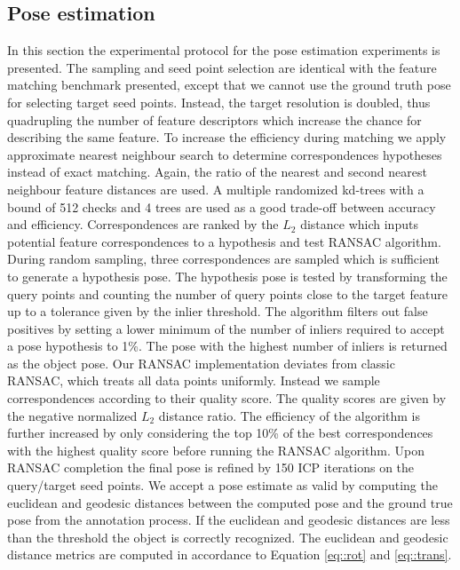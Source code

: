 \documentclass[10pt,twocolumn,letterpaper]{article}
\begin{document}
\subsection{Pose estimation}\label{sec:pose_estimation}
In this section the experimental protocol for the pose estimation experiments is presented. The sampling and seed point selection are identical with the feature matching benchmark presented, except that we cannot use the ground truth pose for selecting target seed points. Instead, the target resolution is doubled, thus quadrupling the number of feature descriptors which increase the chance for describing the same feature. To increase the efficiency during matching we apply approximate nearest neighbour search to determine correspondences hypotheses instead of exact matching. Again, the ratio of the nearest and second nearest neighbour feature distances are used. A multiple randomized kd-trees with a bound of 512 checks and 4 trees are used as a good trade-off between accuracy and efficiency. Correspondences are ranked by the ${L_2}$ distance which inputs potential feature correspondences to a hypothesis and test RANSAC algorithm.
During random sampling, three correspondences are sampled which is sufficient to generate a hypothesis pose. The hypothesis pose is tested by transforming the query points and counting the number of query points close to the target feature up to a tolerance given by the inlier threshold. The algorithm filters out false positives by setting a lower minimum of the number of inliers required to accept a pose hypothesis to 1\%. The pose with the highest number of inliers is returned as the object pose. Our RANSAC implementation deviates from classic RANSAC, which treats all data points uniformly. Instead we sample correspondences according to their quality score. The quality scores are given by the negative normalized ${L_2}$ distance ratio. The efficiency of the algorithm is further increased by only considering the top 10\% of the best correspondences with the highest quality score before running the RANSAC algorithm. Upon RANSAC completion the final pose is refined by 150 ICP iterations on the query/target seed points. We accept a pose estimate as valid by computing the euclidean and geodesic distances between the computed pose and the ground true pose from the annotation process. If the euclidean and geodesic distances are less than the threshold the object is correctly recognized. The euclidean and geodesic distance metrics are computed in accordance to Equation \ref{eq::rot} and \ref{eq::trans}.      
\end{document}
